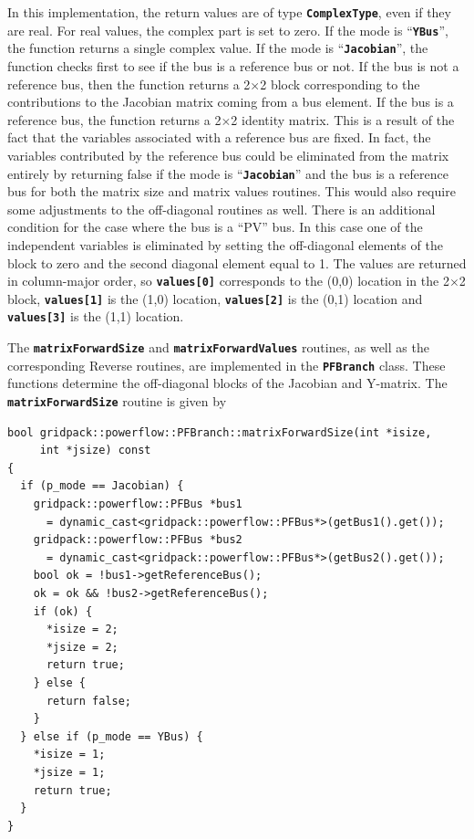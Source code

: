 \documentclass[12pt]{report} %
\begin{document}
In this implementation, the return values are of type \texttt{\textbf{ComplexType}}, even if they are real. For real values, the complex part is set to zero. If the mode is ``\texttt{\textbf{YBus}}'', the function returns a single complex value. If the mode is ``\texttt{\textbf{Jacobian}}'', the function checks first to see if the bus is a reference bus or not. If the bus is not a reference bus, then the function returns a 2$\mathrm{\times}$2 block corresponding to the contributions to the Jacobian matrix coming from a bus element. If the bus is a reference bus, the function returns a 2$\mathrm{\times}$2 identity matrix. This is a result of the fact that the variables associated with a reference bus are fixed. In fact, the variables contributed by the reference bus could be eliminated from the matrix entirely by returning false if the mode is ``\texttt{\textbf{Jacobian}}'' and the bus is a reference bus for both the matrix size and matrix values routines. This would also require some adjustments to the off-diagonal routines as well. There is an additional condition for the case where the bus is a ``PV'' bus. In this case one of the independent variables is eliminated by setting the off-diagonal elements of the block to zero and the second diagonal element equal to 1. The values are returned in column-major order, so \texttt{\textbf{values[0]}} corresponds to the (0,0) location in the 2$\mathrm{\times}$2 block, \texttt{\textbf{values[1]}} is the (1,0) location, \texttt{\textbf{values[2]}} is the (0,1) location and \texttt{\textbf{values[3]}} is the (1,1) location.

The \texttt{\textbf{matrixForwardSize}} and \texttt{\textbf{matrixForwardValues}} routines, as well as the corresponding Reverse routines, are implemented in the \texttt{\textbf{PFBranch}} class. These functions determine the off-diagonal blocks of the Jacobian and Y-matrix. The \texttt{\textbf{matrixForwardSize}} routine is given by

{
\color{red}
\begin{Verbatim}[fontseries=b]
bool gridpack::powerflow::PFBranch::matrixForwardSize(int *isize,
     int *jsize) const
{
  if (p_mode == Jacobian) {
    gridpack::powerflow::PFBus *bus1
      = dynamic_cast<gridpack::powerflow::PFBus*>(getBus1().get());
    gridpack::powerflow::PFBus *bus2
      = dynamic_cast<gridpack::powerflow::PFBus*>(getBus2().get());
    bool ok = !bus1->getReferenceBus();
    ok = ok && !bus2->getReferenceBus();
    if (ok) {
      *isize = 2;
      *jsize = 2;
      return true;
    } else {
      return false;
    }
  } else if (p_mode == YBus) {
    *isize = 1;
    *jsize = 1;
    return true;
  }
}
\end{Verbatim}
}
\end{document}

